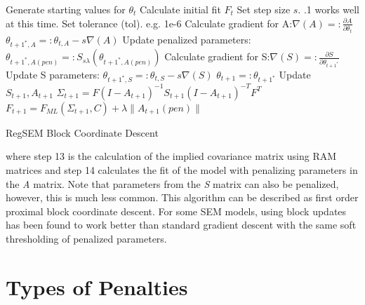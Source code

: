 \documentclass[article]{jss}
\begin{document}
\begin{minipage}{\textwidth}
    \begin{algorithm}[H]
        \begin{algorithmic}[1]
            \State Generate starting values for $\theta_{t}$
            \State Calculate initial fit $F_{t}$
            \State Set step size $s$. .1 works well at this time.
            \State Set tolerance (tol). e.g. 1e-6
            \State Calculate gradient for A:$ \nabla (A) =:  \frac{\partial A}{\partial \theta_{t}}$
            \State $ \theta_{t+1^{*},A} =: \theta_{t,A} - s \nabla(A)$
            \State  Update penalized parameters: $\theta_{t+1^{*},A(pen)} =: S_{s \lambda}(\theta_{t+1^{*},A(pen)})$
            \State Calculate gradient for S:$ \nabla (S) =:  \frac{\partial S}{\partial \theta_{t+1^{*}}}$ 
            \State Update S parameters: $ \theta_{t+1^{*},S} =: \theta_{t,S} - s \nabla(S)$
            \State $\theta_{t+1} =: \theta_{t+1^{*}}$ %
            \State Update $S_{t+1}, A_{t+1}$
            \State $ \Sigma_{t+1} = F(I-A_{t+1})^{-1}S_{t+1}(I-A_{t+1})^{-T}F^{T}$
            \State $ F_{t+1} = F_{ML}(\Sigma_{t+1},C) + \lambda \| A_{t+1}(pen) \|$
            \EndWhile
        \end{algorithmic}
        \caption{RegSEM Block Coordinate Descent}
        \label{alg:seq}
    \end{algorithm}
\end{minipage}

where step 13 is the calculation of the implied covariance matrix using
RAM matrices and step 14 calculates the fit of the model with penalizing
parameters in the \textit{A} matrix. Note that parameters from the
\textit{S} matrix can also be penalized, however, this is much less
common. This algorithm can be described as first order proximal block
coordinate descent. For some SEM models, using block updates has been
found to work better than standard gradient descent with the same soft
thresholding of penalized parameters.

\section{Types of Penalties}\label{types-of-penalties}
\end{document}
